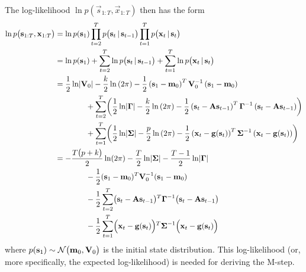 	The log-likelihood \( \ln p(\vec{s}_{1:T}, \vec{x}_{1:T}) \) then has the form
	\begin{align*}
		\ln p\paren{\vec{s}_{1:T}, \vec{x}_{1:T}}
			&= \ln p\paren{\vec{s}_1} \prod_{t = 2}^{T} p\paren{\vec{s}_t \given \vec{s}_{t - 1}} \prod_{t = 1}^{T} p\paren{\vec{x}_t \given \vec{s}_t} \\
			&= \ln p\paren{\vec{s}_1} + \sum_{t = 2}^{T} \ln p\paren{\vec{s}_t \given \vec{s}_{t - 1}} + \sum_{t = 1}^{T} \ln p\paren{\vec{x}_t \given \vec{s}_t} \\
			&= \logGaussianMulti{\vec{s}_1}{\vec{m}_0}{\mat{V}_0}{k} \\
				&\qquad\qquad + \sum_{t = 2}^{T} \paren{ \logGaussianMulti{\vec{s}_t}{\mat{A}\vec{s}_{t - 1}}{\mat{\Gamma}}{k} } \\
				&\qquad\qquad + \sum_{t = 1}^{T} \paren{ \logGaussianMulti{\vec{x}_t}{\vec{g}\paren{\vec{s}_t}}{\mat{\Sigma}}{p} } \\
			&= -\frac{T \paren{p + k}}{2} \ln \paren{2\pi} - \frac{T}{2} \ln \lvert \mat{\Sigma} \rvert - \frac{T - 1}{2} \ln \lvert \mat{\Gamma} \rvert \\
				&\qquad\qquad -\frac{1}{2} \paren{\vec{s}_1 - \vec{m}_0}^T \mat{V}_0^{-1} \paren{\vec{s}_1 - \vec{m}_0} \\
				&\qquad\qquad -\frac{1}{2} \sum_{t = 2}^{T} \paren{\vec{s}_t - \mat{A}\vec{s}_{t - 1}}^T \mat{\Gamma}^{-1} \paren{\vec{s}_t - \mat{A}\vec{s}_{t - 1}} \\
				&\qquad\qquad -\frac{1}{2} \sum_{t = 1}^{T} \paren{\vec{x}_t - \vec{g}\paren{\vec{s}_t}}^T \mat{\Sigma}^{-1} \paren{\vec{x}_t - \vec{g}\paren{\vec{s}_t}}
	\end{align*}
	where \( p\mathopen{}\left( {\boldsymbol{\mathrm{s}}_1}_{{}_{}}\,\negthickspace\right)\mathclose{} \sim \mathcal{N}\mathopen{}\left( {\boldsymbol{\mathrm{m}}_0, \boldsymbol{\mathrm{V}}_0}_{{}_{}}\,\negthickspace\right)\mathclose{} \) is the initial state distribution. This log-likelihood (or, more specifically, the expected log-likelihood) is needed for deriving the M-step.

